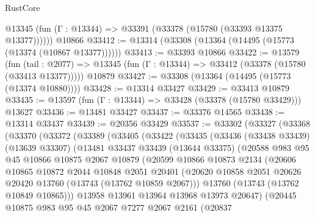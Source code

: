\begin{lexlean}{RustCore}
\begin{coremodule}
      @13345 (fun (Γ : @13344) => @33391 (@33378 (@15780 (@33393 @13375 @13377))))))
    @10866
@33412 := @13314 (@33308 (@13364 (@14495 (@15773 (@13374 (@10867 @13377))))))
@33413 := @33393 @10866
@33422 := @13579
    (fun (tail : @2077) => @13345 (fun (Γ : @13344) => @33412 (@33378 (@15780 (@33413 @13377)))))
    @10879
@33427 := @33308 (@13364 (@14495 (@15773 (@13374 @10880))))
@33428 := @13314 @33427
@33429 := @33413 @10879
@33435 := @13597 (fun (Γ : @13344) => @33428 (@33378 (@15780 @33429))) @13627
@33436 := @13481 @33427
@33437 := @33376 @14565
@33438 := @13314 @33437
@33439 := @20356 @33429
@33537 := @33302
    (@33327
      (@33368
        (@33370
          (@33372
            (@33389
              (@33405
                (@33422
                  (@33435
                    (@33436
                      (@33438 @33439)
                      (@13639 @33307)
                      (@13481
                        @33437
                        @33439
                        (@13644 @33375)
                        (@20588
                          @983
                          @95
                          @45
                          @10866
                          @10875
                          @2067
                          @10879
                          (@20599
                            @10866
                            @10873
                            @2134
                            (@20606
                              @10865
                              @10872
                              @2044
                              @10848
                              @2051
                              @20401
                              (@20620
                                @10858
                                @2051
                                @20626
                                @20420
                                @13760
                                (@13743 (@13762 @10859 @2067)))
                              @13760
                              (@13743 (@13762 @10849 @10865)))
                            @13958
                            @13961
                            @13964
                            @13968
                            @13973
                            @20647)
                          (@20445
                            @10875
                            @983
                            @95
                            @45
                            @2067
                            @7277
                            @2067
                            @2161
                            (@20837

\end{coremodule}
\end{lexlean}

